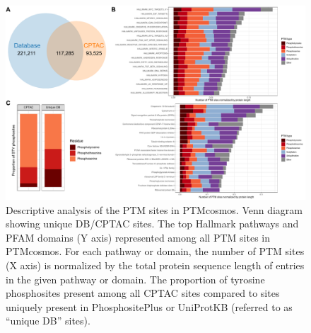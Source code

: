 \begin{figure}[tbp]
    \centering
    \includegraphics[width=\linewidth]{figures/chap03_ptmcosmos/figure2_ptmcosmos_site_detail.pdf}
    \caption[Descriptive analysis of the PTM sites in PTMcosmos.]{%
        Descriptive analysis of the PTM sites in PTMcosmos.
        Venn diagram showing unique DB/CPTAC sites.
        The top Hallmark pathways and PFAM domains (Y axis) represented among all PTM sites in PTMcosmos. For each pathway or domain, the number of PTM sites (X axis) is normalized by the total protein sequence length of entries in the given pathway or domain.
        The proportion of tyrosine phosphosites present among all CPTAC sites compared to sites uniquely present in PhosphositePlus or UniProtKB (referred to as ``unique DB'' sites).
    }
    \label{fig:ptmcosmos-site-detail}
\end{figure}

